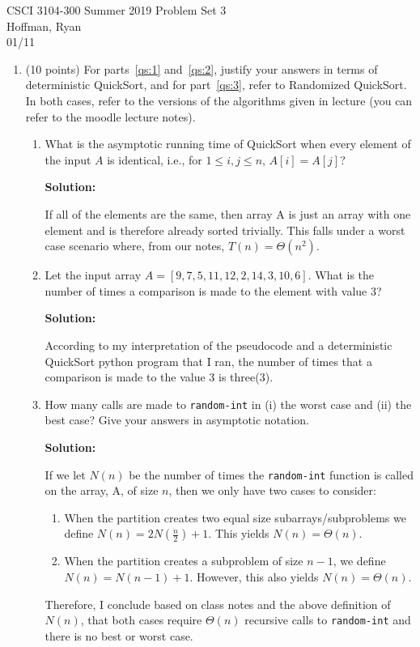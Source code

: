 \documentclass[12pt]{article}
\begin{document}
CSCI 3104-300 Summer 2019 \hfill Problem Set 3 \\
Hoffman, Ryan \\
01/11

\hrulefill

\begin{enumerate}

	\item (10 points) For parts~\eqref{qs:1} and~\eqref{qs:2}, justify your answers in terms of deterministic QuickSort, and 
	for part~\eqref{qs:3}, refer to Randomized QuickSort. In both cases, refer to the versions of the algorithms given in 
	lecture (you can refer to the moodle lecture notes).
	\begin{enumerate}
	\item \label{qs:1} What is the asymptotic running time of QuickSort when every element of the input $A$ is identical, i.e., 
	for $1\leq i,j \leq n$, $A[i] = A[j]$?\par
	\textbf{Solution:}\par
	If all of the elements are the same, then array A is just an array with one element and is therefore already sorted
	trivially. This falls under a worst case scenario where, from our notes, $T(n)=\Theta(n^2)$.\par
	\item \label{qs:2} Let the input array $A = [9, 7, 5, 11, 12, 2, 14, 3, 10, 6]$. What is the number of times a 
	comparison is made to the element with value 3?\par
		\textbf{Solution:}\par
		According to my interpretation of the pseudocode and a deterministic QuickSort python program that I ran, 
		the number of times that a comparison is made to the value 3 is three(3).\par
	\item \label{qs:3} How many calls are made to {\tt random-int} in (i) the worst case and (ii) the best case? Give your 
	answers in asymptotic notation.\par
		\textbf{Solution:}\par
		If we let $N(n)$ be the number of times the {\tt random-int} function is called on the array, A, of size $n$, then we only
		have two cases to consider:\par
		\begin{enumerate}
			\item When the partition creates two equal size subarrays/subproblems we define $N(n)=2N(\frac{n}{2})+1$. 
			This yields $N(n)=\Theta(n)$.
			\item When the partition creates a subproblem of size $n-1$, we define $N(n)=N(n-1)+1$. 
			However, this also yields $N(n)=\Theta(n)$. 
		\end{enumerate}\par
		Therefore, I conclude based on class notes and the above definition of $N(n)$, that both cases require
		$\Theta(n)$ recursive calls to {\tt random-int} and there is no best or worst case.\par
	\end{enumerate}
	

\end{enumerate}
\end{document}
